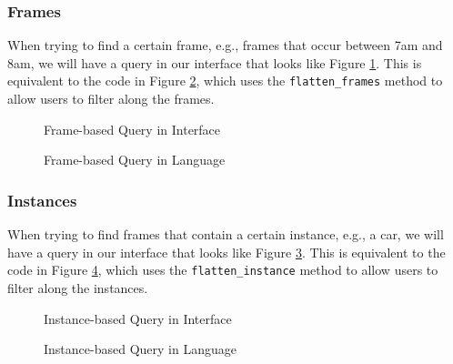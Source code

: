 \subsubsection{Frames}
When trying to find a certain frame, e.g., frames that occur between 7am and 8am, we will have a query in our interface that looks like Figure \ref{fig:Frame1}. 
This is equivalent to the code in Figure \ref{fig:Frame2}, which uses the \texttt{flatten\_frames} method to allow users to filter along the frames.

\begin{figure}[H]
    \caption{Frame-based Query in Interface}
    \label{fig:Frame1}
\end{figure}

\begin{figure}[H]
    \caption{Frame-based Query in Language}
    \label{fig:Frame2}
\end{figure}

\subsubsection{Instances}
When trying to find frames that contain a certain instance, e.g., a car, we will have a query in our interface that looks like Figure \ref{fig:Instance1}.
This is equivalent to the code in Figure \ref{fig:Instance2}, which uses the \texttt{flatten\_instance} method to allow users to filter along the instances.

\begin{figure}[H]
    \caption{Instance-based Query in Interface}
    \label{fig:Instance1}
\end{figure}

\begin{figure}[H]
    \caption{Instance-based Query in Language}
    \label{fig:Instance2}
\end{figure}

